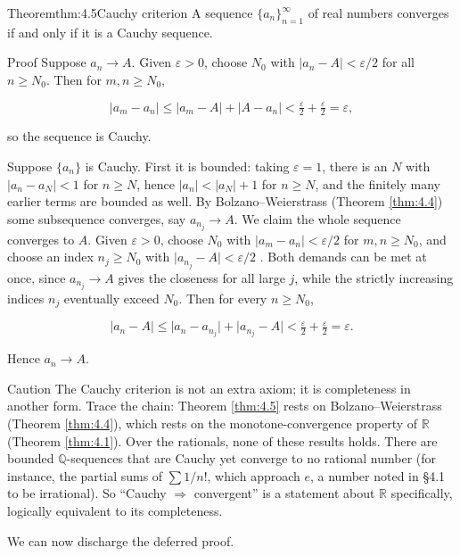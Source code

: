 \documentclass[a4paper,12pt,oneside]{memoir}
\begin{document}
\begin{envtheorem}{Theorem}{thm:4.5}{Cauchy criterion}
A sequence \(\{a_{n}\}_{n=1}^{\infty}\) of real numbers converges if and only if it is a Cauchy sequence.
\end{envtheorem}
\begin{envproof}{Proof}{}{}
Suppose \(a_{n} \to A\). Given \(\varepsilon > 0\), choose \(N_{0}\) with \(\lvert a_{n} - A \rvert < \varepsilon/2\) for all \(n \ge N_{0}\). Then for \(m, n \ge N_{0}\),

\[ \lvert a_{m} - a_{n} \rvert \le \lvert a_{m} - A \rvert + \lvert A - a_{n} \rvert < \tfrac{\varepsilon}{2} + \tfrac{\varepsilon}{2} = \varepsilon, \]

so the sequence is Cauchy.

Suppose \(\{a_{n}\}\) is Cauchy. First it is bounded: taking \(\varepsilon = 1\), there is an \(N\) with \(\lvert a_{n} - a_{N} \rvert < 1\) for \(n \ge N\), hence \(\lvert a_{n} \rvert < \lvert a_{N} \rvert + 1\) for \(n \ge N\), and the finitely many earlier terms are bounded as well. By Bolzano–Weierstrass (Theorem \ref{thm:4.4}) some subsequence converges, say \(a_{n_{j}} \to A\). We claim the whole sequence converges to \(A\). Given \(\varepsilon > 0\), choose \(N_{0}\) with \(\lvert a_{m} - a_{n} \rvert < \varepsilon/2\) for \(m, n \ge N_{0}\), and choose an index \(n_{j} \ge N_{0}\) with \(\lvert a_{n_{j}} - A \rvert < \varepsilon/2\) . Both demands can be met at once, since \(a_{n_{j}} \to A\) gives the closeness for all large \(j\), while the strictly increasing indices \(n_{j}\) eventually exceed \(N_{0}\). Then for every \(n \ge N_{0}\),

\[ \lvert a_{n} - A \rvert \le \lvert a_{n} - a_{n_{j}} \rvert + \lvert a_{n_{j}} - A \rvert < \tfrac{\varepsilon}{2} + \tfrac{\varepsilon}{2} = \varepsilon. \]

Hence \(a_{n} \to A\). \qedmark
\end{envproof}
\begin{envcaution}{Caution}{}{}
The Cauchy criterion is not an extra axiom; it is completeness in another form. Trace the chain: Theorem \ref{thm:4.5} rests on Bolzano–Weierstrass (Theorem \ref{thm:4.4}), which rests on the monotone-convergence property of \(\mathbb{R}\) (Theorem \ref{thm:4.1}). Over the rationals, none of these results holds. There are bounded \(\mathbb{Q}\)-sequences that are Cauchy yet converge to no rational number (for instance, the partial sums of \(\sum 1/n!\), which approach \(e\), a number noted in §4.1 to be irrational). So “Cauchy \(\Rightarrow\) convergent” is a statement about \(\mathbb{R}\) specifically, logically equivalent to its completeness.
\end{envcaution}
We can now discharge the deferred proof.
\end{document}
